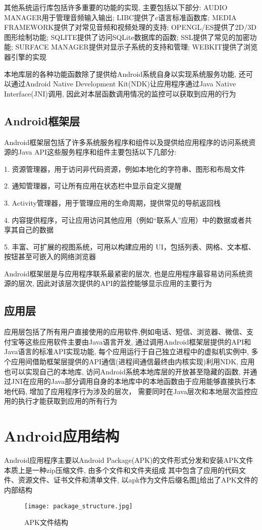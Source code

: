 其他系统运行库包括许多重要的功能的实现, 主要包括以下部分: 
AUDIO MANAGER用于管理音频输入输出; 
LIBC提供了c语言标准函数库; 
MEDIA FRAMEWORK提供了对常见音频和视频处理的支持; 
OPENGL/ES提供了2D/3D图形绘制功能;
SQLITE提供了访问SQLite数据库的函数;
SSL提供了常见的加密功能;
SURFACE MANAGER提供对显示子系统的支持和管理;
WEBKIT提供了浏览器引擎的实现\juhao

本地库层的各种功能函数除了提供给Android系统自身以实现系统服务功能, 还可以通过Android Native Development Kit(NDK)让应用程序通过Java Native Interface(JNI)调用, 因此对本层函数调用情况的监控可以获取到应用的行为\juhao

\subsection*{Android框架层}
Android框架层包括了许多系统服务程序和组件以及提供给应用程序的访问系统资源的Java API\juhao 这些服务程序和组件主要包括以下几部分:

1. 资源管理器，用于访问非代码资源，例如本地化的字符串、图形和布局文件

2. 通知管理器，可让所有应用在状态栏中显示自定义提醒

3. Activity管理器，用于管理应用的生命周期，提供常见的导航返回栈

4. 内容提供程序，可让应用访问其他应用（例如“联系人”应用）中的数据或者共享其自己的数据

5. 丰富、可扩展的视图系统，可用以构建应用的 UI，包括列表、网格、文本框、按钮甚至可嵌入的网络浏览器

Android框架层是与应用程序联系最紧密的层次, 也是应用程序最容易访问系统资源的层次, 因此对该层次提供的API的监控能够显示应用的主要行为\juhao

\subsection*{应用层}
应用层包括了所有用户直接使用的应用软件,例如电话、短信、浏览器、微信、支付宝等\juhao 这些应用软件主要由Java语言开发, 通过调用Android框架层提供的API和Java语言的标准API实现功能, 每个应用运行于自己独立进程中的虚拟机实例中, 多个应用间借助框架层提供的API通信(进程间通信最终由内核实现)\juhao 利用NDK, 应用也可以实现自己的本地库, 访问Android系统本地库层的开放甚至隐藏的函数, 并通过JNI在应用的Java部分调用自身的本地库中的本地函数\juhao 由于应用能够直接执行本地代码, 增加了应用程序行为涉及的层次， 需要同时在Java层次和本地层次监控应用的执行才能获取到应用的所有行为\juhao

\section{Android应用结构}
Android应用程序主要以Android Package(APK)的文件形式分发和安装\juhao APK文件本质上是一种zip压缩文件, 由多个文件和文件夹组成 其中包含了应用的代码文件、资源文件、证书文件和清单文件, 以apk作为文件后缀名\juhao 图\ref{packageStructure}给出了APK文件的内部结构\juhao
\begin{figure}[ht]
	\centering
	\texttt{[image: package\_structure.jpg]}
	\caption{APK文件结构}
	\label{packageStructure}
\end{figure}

